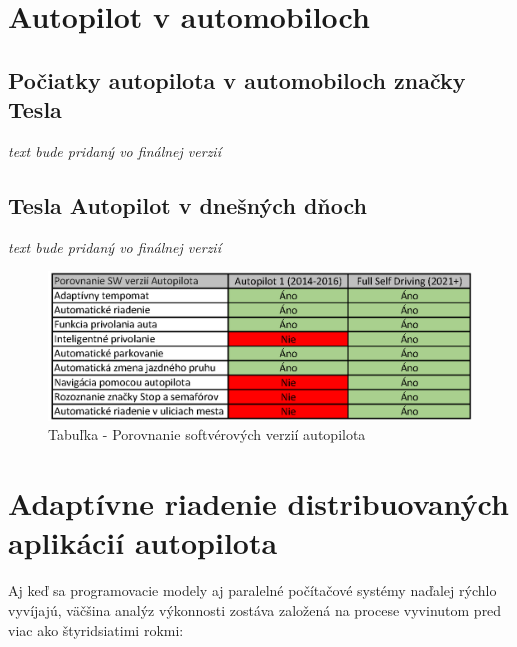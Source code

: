 \documentclass[10pt,twoside,slovak,a4paper]{article}
\begin{document}
\section{Autopilot v automobiloch}

\subsection{Počiatky autopilota v automobiloch značky Tesla} \label{PAVAZ}

\emph{text bude pridaný vo finálnej verzií}

\subsection{Tesla Autopilot v dnešných dňoch}

\emph{text bude pridaný vo finálnej verzií}

\begin{figure}[tbh]
\centering
\includegraphics[scale=0.80]{tabulka.png}
\caption{Tabuľka - Porovnanie softvérových verzií autopilota\cite{Skokan}}
\label{f:tabulka}
\end{figure}

\section{Adaptívne riadenie distribuovaných aplikácií autopilota} \label{ARDAA}

Aj keď sa programovacie modely aj paralelné počítačové systémy naďalej rýchlo vyvíjajú, väčšina analýz výkonnosti zostáva založená na procese vyvinutom pred viac ako štyridsiatimi rokmi:
\end{document}
